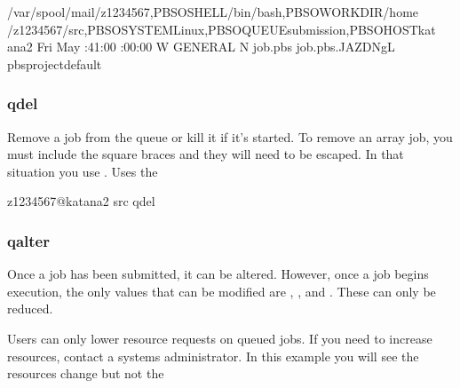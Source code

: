 \documentclass[letterpaper,10pt,english]{sphinxmanual}
\begin{document}
\begin{sphinxVerbatim}[commandchars=\\\{\}]
        /var/spool/mail/z1234567,PBS\PYGZus{}O\PYGZus{}SHELL/bin/bash,PBS\PYGZus{}O\PYGZus{}WORKDIR/home
        /z1234567/src,PBS\PYGZus{}O\PYGZus{}SYSTEMLinux,PBS\PYGZus{}O\PYGZus{}QUEUEsubmission,PBS\PYGZus{}O\PYGZus{}HOSTkat
        ana2
      Fri May   :41:00 
      :00:00
      \PYGZhy{}W GENERAL \PYGZhy{}N job.pbs job.pbs.JAZDNgL
      \PYGZus{}pbs\PYGZus{}project\PYGZus{}default
\end{sphinxVerbatim}


\subsubsection{qdel}
\label{\detokenize{using_katana/running_jobs:qdel}}
Remove a job from the queue or kill it if it’s started. To remove an array job, you must include the square braces and they will need to be escaped. In that situation you use . Uses the 

\begin{sphinxVerbatim}[commandchars=\\\{\}]
\PYG{o}{[}z1234567@katana2 src\PYG{o}{]}\PYGZdl{} qdel 
\end{sphinxVerbatim}


\subsubsection{qalter}
\label{\detokenize{using_katana/running_jobs:qalter}}
Once a job has been submitted, it can be altered. However, once a job begins execution, the only values that can be modified are , , and . These can only be reduced.

Users can only lower resource requests on queued jobs. If you need to increase resources, contact a systems administrator. In this example you will see the resources change \sphinxhyphen{} but not the 
\end{document}
